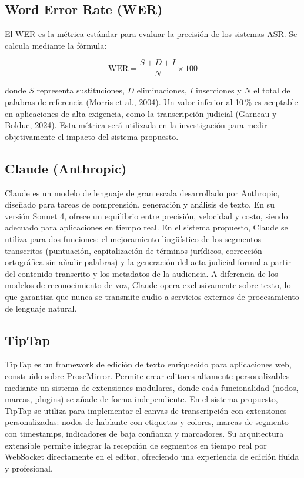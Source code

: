 \documentclass[12pt,a4paper,oneside]{report}
\begin{document}
\subsection{Word Error Rate (WER)}

El WER es la métrica estándar para evaluar la precisión de los sistemas ASR. Se calcula mediante la fórmula:

\begin{equation}
\text{WER} = \frac{S + D + I}{N} \times 100
\end{equation}

donde $S$ representa sustituciones, $D$ eliminaciones, $I$ inserciones y $N$ el total de palabras de referencia (Morris et al., 2004). Un valor inferior al 10\,\% es aceptable en aplicaciones de alta exigencia, como la transcripción judicial (Garneau y Bolduc, 2024). Esta métrica será utilizada en la investigación para medir objetivamente el impacto del sistema propuesto.

\subsection{Claude (Anthropic)}

Claude es un modelo de lenguaje de gran escala desarrollado por Anthropic, diseñado para tareas de comprensión, generación y análisis de texto. En su versión Sonnet 4, ofrece un equilibrio entre precisión, velocidad y costo, siendo adecuado para aplicaciones en tiempo real. En el sistema propuesto, Claude se utiliza para dos funciones: el mejoramiento lingüístico de los segmentos transcritos (puntuación, capitalización de términos jurídicos, corrección ortográfica sin añadir palabras) y la generación del acta judicial formal a partir del contenido transcrito y los metadatos de la audiencia. A diferencia de los modelos de reconocimiento de voz, Claude opera exclusivamente sobre texto, lo que garantiza que nunca se transmite audio a servicios externos de procesamiento de lenguaje natural.

\subsection{TipTap}

TipTap es un framework de edición de texto enriquecido para aplicaciones web, construido sobre ProseMirror. Permite crear editores altamente personalizables mediante un sistema de extensiones modulares, donde cada funcionalidad (nodos, marcas, plugins) se añade de forma independiente. En el sistema propuesto, TipTap se utiliza para implementar el canvas de transcripción con extensiones personalizadas: nodos de hablante con etiquetas y colores, marcas de segmento con timestamps, indicadores de baja confianza y marcadores. Su arquitectura extensible permite integrar la recepción de segmentos en tiempo real por WebSocket directamente en el editor, ofreciendo una experiencia de edición fluida y profesional.
\end{document}
